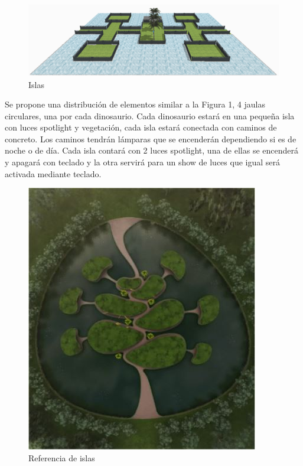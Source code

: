 \documentclass[12pt]{article} %
\begin{document}
	\begin{figure}[h]
		\begin{center}
			\includegraphics[scale=1.65]{images/vista.png}
			\caption{Islas}
		\end{center}  		
	\end{figure}
	
	\setlength{\parindent}{1.0cm}
	Se propone una distribución de elementos similar a la Figura 1, 4 jaulas circulares, una por cada dinosaurio. 
	Cada dinosaurio estará en una pequeña isla con luces spotlight y vegetación, 
	cada isla estará conectada con caminos de concreto. 
	Los caminos tendrán lámparas que se encenderán dependiendo si es de noche o de día. 
	Cada isla contará con 2 luces spotlight, una de ellas se encenderá y apagará con teclado y la otra servirá para 
	un show de luces que igual será activada mediante teclado.
	\setlength{\parindent}{0.0cm}
	
	\begin{figure}[h]
		\begin{center}
			\includegraphics[scale=0.5]{images/Isla.JPG}
		\caption{Referencia de islas}
		\end{center}  		
	\end{figure}
	
\end{document}
